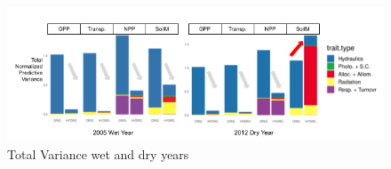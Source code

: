 \begin{figure}[h]
    \centering
    \includegraphics[width=.95\textwidth]{Hydro_Paper_LaTeX/Hydro_Paper_Figures/Total_variance.png}
    \caption[Total Variance]{Total Variance wet and dry years}
    \label{fig:total_var}
\end{figure}